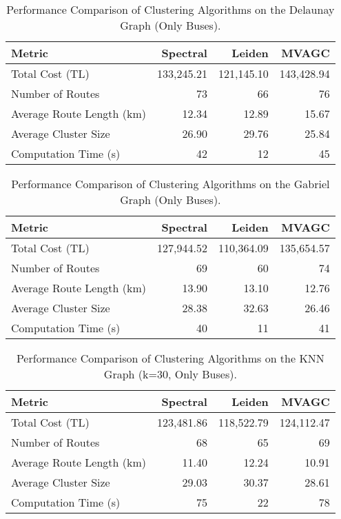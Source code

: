 \begin{table}[h]
\centering
\label{tab:delaunay_results}
\begin{tabular}{lrrr}
\toprule
Metric & Spectral & Leiden & MVAGC \\
\midrule
Total Cost (TL) & 133,245.21 & 121,145.10 & 143,428.94 \\
Number of Routes & 73 & 66 & 76 \\
Average Route Length (km) & 12.34 & 12.89 & 15.67 \\
Average Cluster Size & 26.90 & 29.76 & 25.84 \\
Computation Time (s) & 42 & 12 & 45 \\
\bottomrule
\end{tabular}
\caption{Performance Comparison of Clustering Algorithms on the Delaunay Graph (Only Buses).}
\end{table}

\begin{table}[h]
\centering
\label{tab:gabriel_results}
\begin{tabular}{lrrr}
\toprule
Metric & Spectral & Leiden & MVAGC \\
\midrule
Total Cost (TL) & 127,944.52 & 110,364.09 & 135,654.57 \\
Number of Routes & 69 & 60 & 74 \\
Average Route Length (km) & 13.90 & 13.10 & 12.76 \\
Average Cluster Size & 28.38 & 32.63 & 26.46 \\
Computation Time (s) & 40 & 11 & 41 \\
\bottomrule
\end{tabular}
\caption{Performance Comparison of Clustering Algorithms on the Gabriel Graph (Only Buses).}
\end{table}

\begin{table}[h]
\centering
\label{tab:knn_results}
\begin{tabular}{lrrr}
\toprule
Metric & Spectral & Leiden & MVAGC \\
\midrule
Total Cost (TL) & 123,481.86 & 118,522.79 & 124,112.47 \\
Number of Routes & 68 & 65 & 69 \\
Average Route Length (km) & 11.40 & 12.24 & 10.91 \\
Average Cluster Size & 29.03 & 30.37 & 28.61 \\
Computation Time (s) & 75 & 22 & 78 \\
\bottomrule
\end{tabular}
\caption{Performance Comparison of Clustering Algorithms on the KNN Graph (k=30, Only Buses).}
\end{table}

